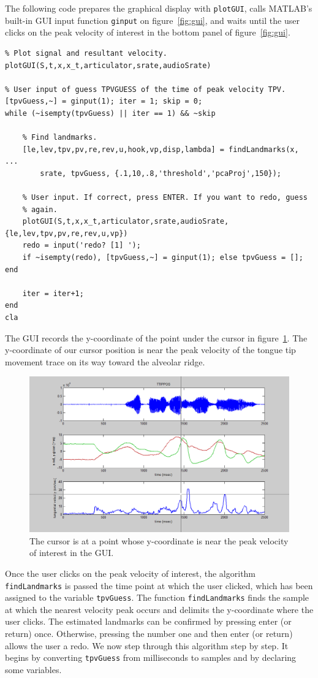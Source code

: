 \documentclass[a4paper, 12pt]{article}
\begin{document}
The following code prepares the graphical display with \texttt{plotGUI}, calls MATLAB's built-in GUI input function \texttt{ginput} on figure~\ref{fig:gui}, and waits until the user clicks on the peak velocity of interest in the bottom panel of figure~\ref{fig:gui}.
\begin{verbatim}
% Plot signal and resultant velocity.
plotGUI(S,t,x,x_t,articulator,srate,audioSrate)

% User input of guess TPVGUESS of the time of peak velocity TPV.
[tpvGuess,~] = ginput(1); iter = 1; skip = 0;
while (~isempty(tpvGuess) || iter == 1) && ~skip
    
    % Find landmarks.
    [le,lev,tpv,pv,re,rev,u,hook,vp,disp,lambda] = findLandmarks(x, ...
        srate, tpvGuess, {.1,10,.8,'threshold','pcaProj',150});
    
    % User input. If correct, press ENTER. If you want to redo, guess 
    % again.
    plotGUI(S,t,x,x_t,articulator,srate,audioSrate,{le,lev,tpv,pv,re,rev,u,vp})
    redo = input('redo? [1] ');
    if ~isempty(redo), [tpvGuess,~] = ginput(1); else tpvGuess = []; end
    
    iter = iter+1;
end
cla
\end{verbatim}
The GUI records the y-coordinate of the point under the cursor in figure~\ref{fig:crosshairs}. The y-coordinate of our cursor position is near the peak velocity of the tongue tip movement trace on its way toward the alveolar ridge. 
\begin{figure}
\centering
\includegraphics[width=.8\textwidth]{p2.png}
\caption{The cursor is at a point whose y-coordinate is near the peak velocity of interest in the GUI.}
\label{fig:crosshairs}
\end{figure}
Once the user clicks on the peak velocity of interest, the algorithm \texttt{findLandmarks} is passed the time point at which the user clicked, which has been assigned to the variable \texttt{tpvGuess}. The function \texttt{findLandmarks} finds the sample at which the nearest velocity peak occurs and delimits the y-coordinate where the user clicks. The estimated landmarks can be confirmed by pressing enter (or return) once. Otherwise, pressing the number one and then enter (or return) allows the user a redo. We now step through this algorithm step by step. It begins by converting \texttt{tpvGuess} from milliseconds to samples and by declaring some variables.
\end{document}
